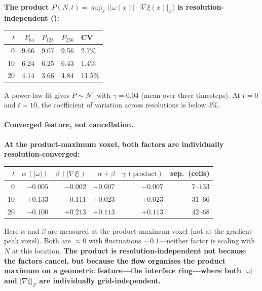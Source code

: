\documentclass[11pt,a4paper]{article}
\theoremstyle{definition}
\newcommand{\grad}{\nabla}
\newcommand{\abs}[1]{\lvert #1 \rvert}
\newcommand{\strongclaim}[1]{\textbf{#1}}  %
\begin{document}
\strongclaim{The product $P(N,t) = \sup_x\bigl(\abs{\omega(x)}\cdot
\abs{\grad\xi(x)}_F\bigr)$ is resolution-independent
(\Cref{fig:invariant-ring}):}

\begin{center}
\begin{tabular}{rrrrl}
\toprule
$t$ & $P_{64}$ & $P_{128}$ & $P_{256}$ & CV \\
\midrule
0  & 9.66 & 9.07 & 9.56 & 2.7\% \\
10 & 6.24 & 6.25 & 6.43 & 1.4\% \\
20 & 4.14 & 3.66 & 4.84 & 11.5\% \\
\bottomrule
\end{tabular}
\end{center}

A power-law fit gives $P\sim N^\gamma$ with $\gamma=0.04$ (mean over
three timesteps).  At $t=0$ and $t=10$, the coefficient of variation
across resolutions is below $3\%$.

\paragraph{Converged feature, not cancellation.}
\strongclaim{At the product-maximum voxel, both factors are
individually resolution-converged:}

\begin{center}
\begin{tabular}{rrrrrr}
\toprule
$t$ & $\alpha\,(\abs{\omega})$ & $\beta\,(\abs{\grad\xi})$
  & $\alpha+\beta$ & $\gamma\,(\text{product})$ & sep.\ (cells) \\
\midrule
0  & $-0.005$ & $-0.002$ & $-0.007$ & $-0.007$ & $7$--$133$ \\
10 & $+0.133$ & $-0.111$ & $+0.023$ & $+0.023$ & $31$--$66$ \\
20 & $-0.100$ & $+0.213$ & $+0.113$ & $+0.113$ & $42$--$68$ \\
\bottomrule
\end{tabular}
\end{center}

Here $\alpha$ and $\beta$ are measured at the product-maximum voxel
(not at the gradient-peak voxel).
Both are $\approx 0$ with fluctuations ${\sim}\,0.1$---neither factor
is scaling with $N$ at this location.  \strongclaim{The product is
resolution-independent not because the factors cancel, but because the
flow organises the product maximum on a geometric feature---the
interface ring---where both $\abs{\omega}$ and $\abs{\grad\xi}_F$
are individually grid-independent.}
\end{document}
